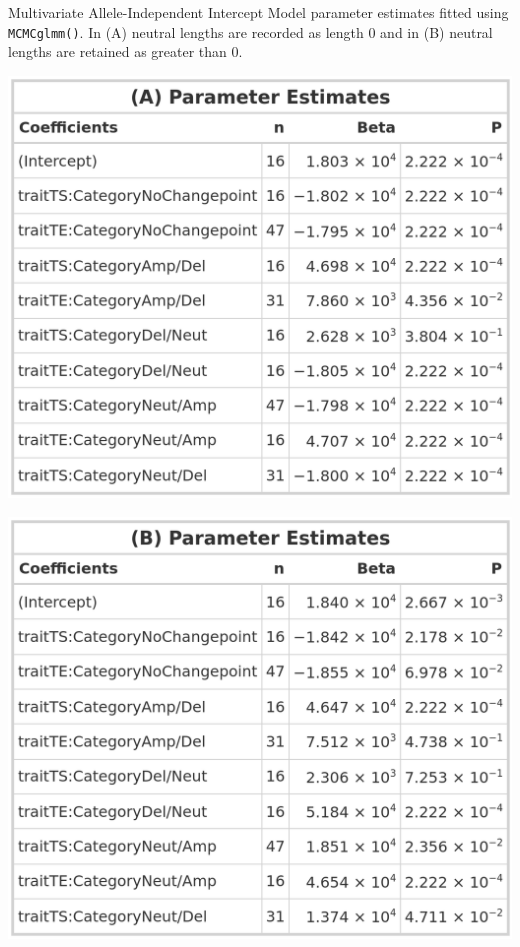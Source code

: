 \begin{table}[!htb]
    \caption[Multivariate Allele-Independent Intercept Model parameter estimates fitted using \texttt{MCMCglmm()}.]{Multivariate Allele-Independent Intercept Model parameter estimates fitted using \texttt{MCMCglmm()}. In (A) neutral lengths are recorded as length 0 and in (B) neutral lengths are retained as greater than 0.}
     \begin{subtable}[t]{.49\textwidth}
      \centering
      \includegraphics[width = 1\textwidth]{../tables/Chapter_5/Multivariate_MCMC_7_AI_Model.png}
    \end{subtable}%
    \hspace{0.5cm}
     \begin{subtable}[t]{.49\textwidth}
      \centering
         \includegraphics[width = 1\textwidth]{../tables/Chapter_5/Multivariate_MCMC_7_Neut_AI_Model.png}
    \end{subtable} 
\end{table}

